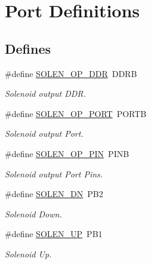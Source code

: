 \hypertarget{group__port_defs}{\section{Port Definitions}
\label{group__port_defs}
}
\subsection*{Defines}
\begin{DoxyCompactItemize}
\item 
\#define \hyperlink{group__port_defs_ga3ca3b069d7464c17c03b5b1e7da788fd}{S\-O\-L\-E\-N\-\_\-\-O\-P\-\_\-\-D\-D\-R}~D\-D\-R\-B
\begin{DoxyCompactList}\small\item\em Solenoid output D\-D\-R. \end{DoxyCompactList}\item 
\#define \hyperlink{group__port_defs_ga4ad600582a951bdd4b75311388dc6ae7}{S\-O\-L\-E\-N\-\_\-\-O\-P\-\_\-\-P\-O\-R\-T}~P\-O\-R\-T\-B
\begin{DoxyCompactList}\small\item\em Solenoid output Port. \end{DoxyCompactList}\item 
\#define \hyperlink{group__port_defs_ga473a2cf5e606d18feb583ec4749a49ea}{S\-O\-L\-E\-N\-\_\-\-O\-P\-\_\-\-P\-I\-N}~P\-I\-N\-B
\begin{DoxyCompactList}\small\item\em Solenoid output Port Pins. \end{DoxyCompactList}\item 
\#define \hyperlink{group__port_defs_gae38dab54770629f5f2b7975164123353}{S\-O\-L\-E\-N\-\_\-\-D\-N}~P\-B2
\begin{DoxyCompactList}\small\item\em Solenoid Down. \end{DoxyCompactList}\item 
\#define \hyperlink{group__port_defs_gaeacdff688cfbf944da03e3c972f878f0}{S\-O\-L\-E\-N\-\_\-\-U\-P}~P\-B1
\begin{DoxyCompactList}\small\item\em Solenoid Up. \end{DoxyCompactList}\end{DoxyCompactItemize}
